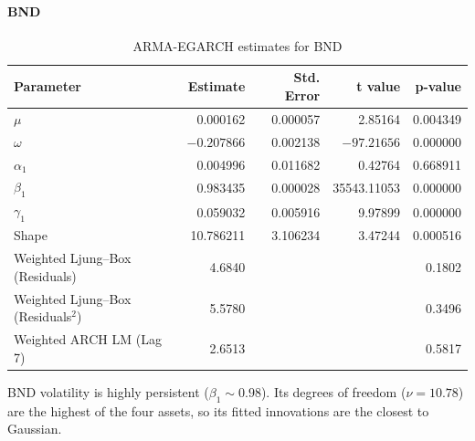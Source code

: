 \documentclass[12pt,a4paper]{article}
\begin{document}
\paragraph{BND}
\begin{table}[H]
\centering
\begin{tabular}{lrrrr}
\toprule
Parameter & Estimate & Std. Error & t value & p-value \\
\midrule
$\mu$ & 0.000162 & 0.000057 & 2.85164 & 0.004349 \\
$\omega$ & $-0.207866$ & 0.002138 & $-97.21656$ & 0.000000 \\
$\alpha_1$ & 0.004996 & 0.011682 & 0.42764 & 0.668911 \\
$\beta_1$ & 0.983435 & 0.000028 & 35543.11053 & 0.000000 \\
$\gamma_1$ & 0.059032 & 0.005916 & 9.97899 & 0.000000 \\
Shape & 10.786211 & 3.106234 & 3.47244 & 0.000516 \\
\midrule
Weighted Ljung--Box (Residuals) & 4.6840 & & & 0.1802 \\
Weighted Ljung--Box (Residuals$^2$) & 5.5780 & & & 0.3496 \\
Weighted ARCH LM (Lag 7) & 2.6513 & & & 0.5817 \\
\bottomrule
\end{tabular}
\caption{ARMA-EGARCH estimates for BND}
\end{table}
BND volatility is highly persistent ($\beta_1 \sim 0.98$). Its degrees of freedom ($\nu=10.78$) are the highest of the four assets, so its fitted innovations are the closest to Gaussian.
\end{document}
